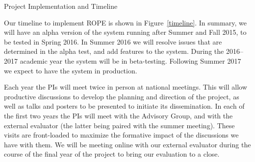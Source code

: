 \documentclass[11pt]{article}
\begin{document}
\begin{section}{Project Implementation and Timeline}

Our timeline to implement ROPE is shown in Figure~\ref{timeline}.  In
summary, we will have an alpha version of the system running after Summer
and Fall 2015, to be tested in Spring 2016.  In Summer 2016 we
will resolve issues that are determined in the alpha test, and add
features to the system.  During the 2016--2017 academic year the system will be
in beta-testing.  Following Summer 2017 we expect to have the system in
production.

Each year the PIs will meet twice in person at national meetings.  This
will allow productive discussions to develop the planning and
direction of the project, as well as talks and posters to be presented to initiate its
dissemination.  In each of the first two years the PIs will meet with the
Advisory Group, and with the external evaluator (the latter being paired
with the summer meeting).  These visits are front-loaded to maximize the
formative impact of the discussions we have with them.  We
will be meeting online with our external evaluator during the course of the
final year of the project to bring our evaluation to a close.


\end{section}
\end{document}
